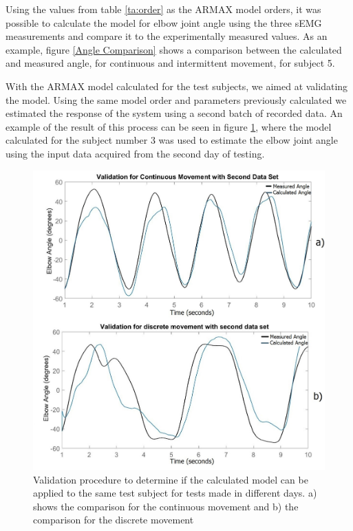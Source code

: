 Using the values from table \ref{ta:order} as the ARMAX model orders, it was possible to calculate the model for elbow joint angle using the three sEMG measurements and compare it to the experimentally measured values. As an example, figure \ref{Angle Comparison} shows a comparison between the calculated and measured angle, for continuous and intermittent movement, for subject 5.

With the ARMAX model calculated for the test subjects, we aimed at validating the model. Using the same model order and parameters previously calculated we estimated the response of the system using a second batch of recorded data. An example of the result of this process can be seen in figure \ref{Validation Procedure}, where the model calculated for the subject number 3 was used to estimate the elbow joint angle using the input data acquired from the second day of testing.

\begin{figure}[thpb]
      \centering
      \includegraphics[scale=0.5]{Images/validation.jpg}
      \caption{Validation procedure to determine if the calculated model can be applied to the same test subject for tests made in different days. a) shows the comparison for the continuous movement and b) the comparison for the discrete movement}
      \label{Validation Procedure}
   \end{figure}

